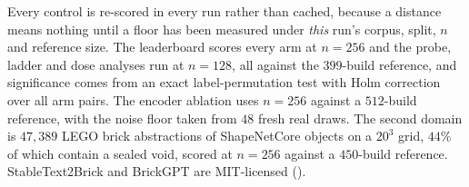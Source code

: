 Every control is re-scored in every run rather than cached, because a distance means
nothing until a floor has been measured under \emph{this} run's corpus, split, $n$ and
reference size. The leaderboard scores every arm at $n{=}256$ and the probe, ladder and dose
analyses run at $n{=}128$, all against the $399$-build reference, and significance comes
from an exact label-permutation test with Holm correction \citep{holm1979simple} over all arm pairs. The
encoder ablation uses $n{=}256$ against a $512$-build reference, with the noise floor taken
from $48$ fresh real draws. The second domain is $47{,}389$ LEGO brick abstractions of
ShapeNetCore objects on a $20^3$ grid, $44\%$ of which contain a sealed void, scored at
$n{=}256$ against a $450$-build reference. StableText2Brick and BrickGPT are MIT-licensed
().
